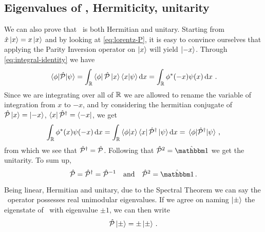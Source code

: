         \subsection{Eigenvalues of \hP, Hermiticity, unitarity}
            We can also prove that \hP\ is both Hermitian and unitary. Starting from $\hat{x}\ket{x} = x\ket{x}$ and by looking at \eqref{eq:lorentz-P}, it is easy to convince ourselves that applying the Parity Inversion operator on $\ket{x}$ will yield $\ket{-x}$. Through \eqref{eq:integral-identity} we have
            \begin{equation*}
                \mel{\phi}{\hP}{\psi}
                = \int\nolimits_{\bbR}\bra{\phi}\hP\ket{x}\bra{x}\ket{\psi}\dd{x}
                = \int\nolimits_{\bbR}\phi^*\pqty{-x}\psi\pqty{x}\dd{x}
                \myperiod
            \end{equation*}
            Since we are integrating over all of $\mathbb{R}$ we are allowed to rename the variable of integration from $x$ to $-x$, and by considering the hermitian conjugate of $\mathcal{\hat{P}}\ket{x} = \ket{-x}$, $\bra{x}\mathcal{\hat{P}}^\dag = \bra{-x}$, we get
            \begin{equation*}
                \int\nolimits_{\bbR}\phi^*\pqty{x}\psi\pqty{-x}\dd{x}
                = \int\nolimits_{\bbR}\bra{\phi}\ket{x}\bra{x}\hP^\dag\ket{\psi}\dd{x}
                = \mel{\phi}{\hP^\dag}{\psi}
                \mycomma
            \end{equation*}
            from which we see that $\mathcal{\hat{P}}^\dag = \mathcal{\hat{P}}$. Following that $\hP^2 = \togglehat{\idM}$ we get the unitarity. To sum up,
            \begin{equation}
                \label{eq:P-properties}
                \hP
                = \hP^\dag
                = \hP^{-1}
                \qand
                \hP^2
                = \togglehat{\idM}
                \myperiod
            \end{equation}

            Being linear, Hermitian and unitary, due to the Spectral Theorem we can say the \hP\ operator possesses real unimodular eigenvalues. If we agree on naming $\ket{\pm}$ the eigenstate of \hP\ with eigenvalue $\pm 1$, we can then write
            \begin{equation}
                \label{eq:eigenvalue-problem-P}
                \mathcal{\hat{P}}\ket{\pm}
                = \pm\ket{\pm}\,\text{.}
            \end{equation}
        

